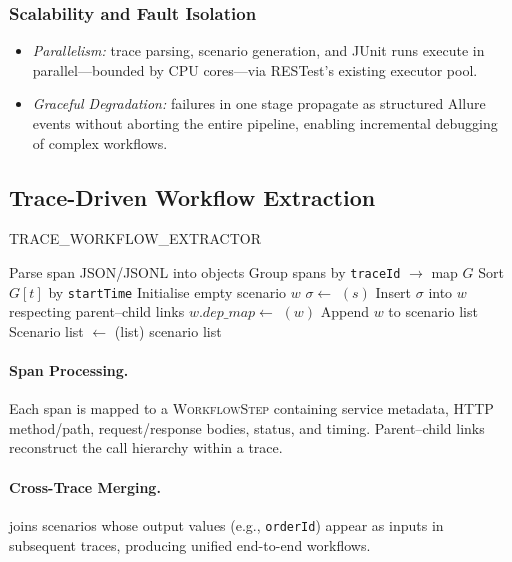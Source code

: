 \subsubsection*{Scalability and Fault Isolation}
\begin{itemize}[leftmargin=*]
  \item \emph{Parallelism:} trace parsing, scenario generation, and JUnit runs
        execute in parallel—bounded by CPU cores—via RESTest’s existing
        executor pool.
  \item \emph{Graceful Degradation:} failures in one stage propagate as
        structured Allure events without aborting the entire pipeline, enabling
        incremental debugging of complex workflows.
\end{itemize}

\subsection{Trace-Driven Workflow Extraction}
\label{ssec:extract}
\begin{algorithm}[tb]
\caption{TRACE\_WORKFLOW\_EXTRACTOR}\label{alg:extract}
\footnotesize
\begin{algorithmic}[1]
\Require{}
\Ensure{}
\State Parse span JSON/JSONL into objects
\State Group spans by \texttt{traceId} $\rightarrow$ map $G$
    \State Sort $G[t]$ by \texttt{startTime}
    \State Initialise empty scenario $w$
        \State $\sigma \leftarrow$ $(s)$
        \State Insert $\sigma$ into $w$ respecting parent–child links
    \EndFor
    \State $w.dep\_map \leftarrow$ $(w)$
    \State Append $w$ to scenario list
\EndFor
\State Scenario list $\gets$ (list)
\State \Return scenario list
\end{algorithmic}
\end{algorithm}

\paragraph{Span Processing.}
Each span is mapped to a \textsc{WorkflowStep} containing service metadata,
HTTP method/path, request/response bodies, status, and timing.  Parent–child
links reconstruct the call hierarchy within a trace.

\paragraph{Cross-Trace Merging.}
 joins scenarios whose output values (e.g.,
\texttt{orderId}) appear as inputs in subsequent traces, producing unified
end-to-end workflows.

